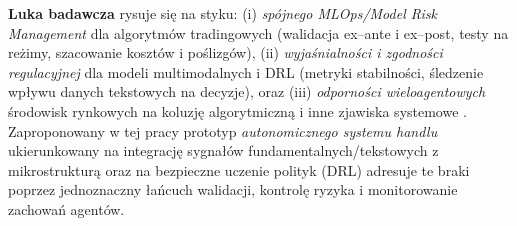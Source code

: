 \textbf{Luka badawcza} rysuje się na styku: (i) \emph{spójnego MLOps/Model Risk Management} dla algorytmów tradingowych (walidacja ex–ante i ex–post, testy na reżimy, szacowanie kosztów i poślizgów), (ii) \emph{wyjaśnialności i zgodności regulacyjnej} dla modeli multimodalnych i DRL (metryki stabilności, śledzenie wpływu danych tekstowych na decyzje), oraz (iii) \emph{odporności wieloagentowych} środowisk rynkowych na koluzję algorytmiczną i inne zjawiska systemowe \parencite{hambly2023, vancsura2025, dou2025}. Zaproponowany w tej pracy prototyp \emph{autonomicznego systemu handlu} ukierunkowany na integrację sygnałów fundamentalnych/tekstowych z mikrostrukturą oraz na bezpieczne uczenie polityk (DRL) adresuje te braki poprzez jednoznaczny łańcuch walidacji, kontrolę ryzyka i monitorowanie zachowań agentów.


